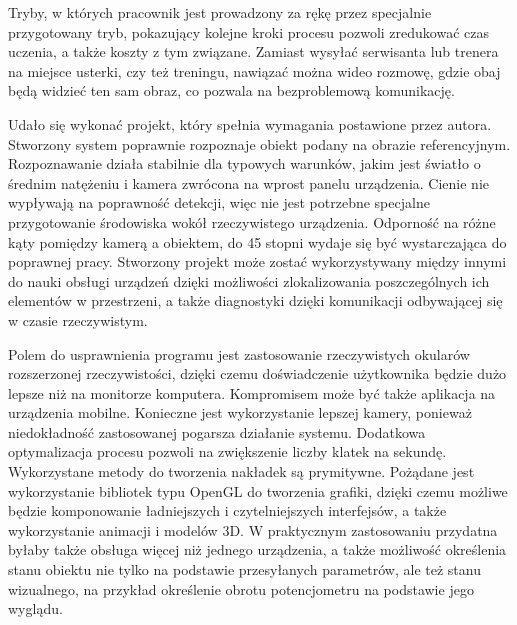 \documentclass[12pt,twoside,polish]{article}
\begin{document}
Tryby, w których pracownik jest prowadzony za rękę przez specjalnie przygotowany tryb, pokazujący kolejne kroki procesu pozwoli zredukować czas uczenia, a także koszty z tym związane. Zamiast wysyłać serwisanta lub trenera na miejsce usterki, czy też treningu, nawiązać można wideo rozmowę, gdzie obaj będą widzieć ten sam obraz, co pozwala na bezproblemową komunikację.

Udało się wykonać projekt, który spełnia wymagania postawione przez autora. Stworzony system poprawnie rozpoznaje obiekt podany na obrazie referencyjnym. Rozpoznawanie działa stabilnie dla typowych warunków, jakim jest światło o średnim natężeniu i kamera zwrócona na wprost panelu urządzenia. Cienie nie wypływają na poprawność detekcji, więc nie jest potrzebne specjalne przygotowanie środowiska wokół rzeczywistego urządzenia. Odporność na różne kąty pomiędzy kamerą a obiektem, do 45 stopni wydaje się być wystarczająca do poprawnej pracy. Stworzony projekt może zostać wykorzystywany między innymi do nauki obsługi urządzeń dzięki możliwości zlokalizowania poszczególnych ich elementów w przestrzeni, a także diagnostyki dzięki komunikacji odbywającej się w czasie rzeczywistym.

Polem do usprawnienia programu jest zastosowanie rzeczywistych okularów rozszerzonej rzeczywistości, dzięki czemu doświadczenie użytkownika będzie dużo lepsze niż na monitorze komputera. Kompromisem może być także aplikacja na urządzenia mobilne. Konieczne jest wykorzystanie lepszej kamery, ponieważ niedokładność zastosowanej pogarsza działanie systemu. Dodatkowa optymalizacja procesu pozwoli na zwiększenie liczby klatek na sekundę. Wykorzystane metody do tworzenia nakładek są prymitywne. Pożądane jest wykorzystanie bibliotek typu OpenGL do tworzenia grafiki, dzięki czemu możliwe będzie komponowanie ładniejszych i czytelniejszych interfejsów, a także wykorzystanie animacji i modelów 3D. W praktycznym zastosowaniu przydatna byłaby także obsługa więcej niż jednego urządzenia, a także możliwość określenia stanu obiektu nie tylko na podstawie przesyłanych parametrów, ale też stanu wizualnego, na przykład określenie obrotu potencjometru na podstawie jego wyglądu.
\clearpage

\end{document}
